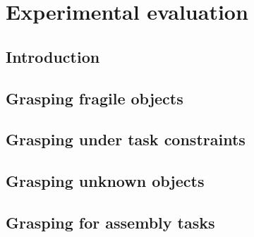 \chapter{Experimental evaluation}
\section{Introduction}
\section{Grasping fragile objects}

\section{Grasping under task constraints}

\section{Grasping unknown objects}

\section{Grasping for assembly tasks}





